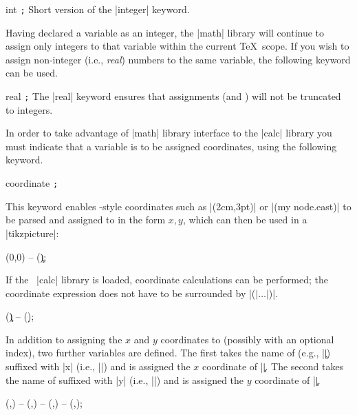 \begin{math-keyword}{{int} \texttt{;}}
	Short version of the |integer| keyword.
\end{math-keyword}

	Having declared a variable as an integer, the |math| library will 
	continue to assign only integers to that variable within the 
	current \TeX\ scope. If you wish to assign non-integer (i.e., \emph{real})
	numbers to the same variable, the following keyword can be used.

\begin{math-keyword}{{real} \texttt{;}}
	The |real| keyword ensures that assignments 
	(and ) will not be truncated to integers.
\end{math-keyword}
	
	In order to take advantage of |math| library interface to the
	|calc| library	you must indicate that a variable is to be assigned 
	coordinates, using the following keyword.
	
\begin{math-keyword}{{coordinate} 
\texttt{;}}%

	This keyword enables \tikzname-style coordinates such as |(2cm,3pt)| or
	|(my node.east)| to be parsed and
	assigned to  in the form $x,y$, which can then be used
	in a |tikzpicture|:

\begin{codeexample}[]
\tikz\draw (0,0) -- (\c);
\end{codeexample}
	
	If the \tikzname\ |calc| library is loaded,
	coordinate calculations can be performed; 
	the coordinate expression does not have to be
	surrounded by |($|\ldots|$)|.
	
\begin{codeexample}[]
\tikz\draw (\c) -- (\d);
\end{codeexample}
	
	In addition to assigning the $x$ and $y$ coordinates to 
	(possibly with an optional index), two further
	variables are defined. The first takes the name of 
	(e.g., |\c|) suffixed with |x| (i.e., |\cx|) and is assigned the
	$x$ coordinate of |\c|.  
	 The second takes the name of 
		suffixed with |y| (i.e., |\cy|) and is assigned the
		$y$ coordinate of |\c|.  

\begin{codeexample}[]
\tikz\draw (,) -- (,) -- (,) -- (,);
\end{codeexample}
	
\end{math-keyword}

